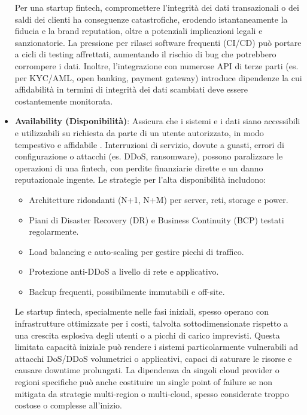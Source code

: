 \begin{itemize}
Per una startup fintech, compromettere l'integrità dei dati transazionali o dei saldi dei clienti ha conseguenze catastrofiche, erodendo istantaneamente la fiducia e la brand reputation, oltre a potenziali implicazioni legali e sanzionatorie. La pressione per rilasci software frequenti (CI/CD) può portare a cicli di testing affrettati, aumentando il rischio di bug che potrebbero corrompere i dati. Inoltre, l'integrazione con numerose API di terze parti (es. per KYC/AML, open banking, payment gateway) introduce dipendenze la cui affidabilità in termini di integrità dei dati scambiati deve essere costantemente monitorata.

\item \textbf{Availability (Disponibilità)}: Assicura che i sistemi e i dati siano accessibili e utilizzabili su richiesta da parte di un utente autorizzato, in modo tempestivo e affidabile \cite{NIST_SP_1800_26}. Interruzioni di servizio, dovute a guasti, errori di configurazione o attacchi (es. DDoS, ransomware), possono paralizzare le operazioni di una fintech, con perdite finanziarie dirette e un danno reputazionale ingente. Le strategie per l'alta disponibilità includono:
\begin{itemize}
    \item Architetture ridondanti (N+1, N+M) per server, reti, storage e power.
    \item Piani di Disaster Recovery (DR) e Business Continuity (BCP) testati regolarmente.
    \item Load balancing e auto-scaling per gestire picchi di traffico.
    \item Protezione anti-DDoS a livello di rete e applicativo.
    \item Backup frequenti, possibilmente immutabili e off-site.
\end{itemize}

Le startup fintech, specialmente nelle fasi iniziali, spesso operano con infrastrutture ottimizzate per i costi, talvolta sottodimensionate rispetto a una crescita esplosiva degli utenti o a picchi di carico imprevisti. Questa limitata capacità iniziale può rendere i sistemi particolarmente vulnerabili ad attacchi DoS/DDoS volumetrici o applicativi, capaci di saturare le risorse e causare downtime prolungati. La dipendenza da singoli cloud provider o regioni specifiche può anche costituire un single point of failure se non mitigata da strategie multi-region o multi-cloud, spesso considerate troppo costose o complesse all'inizio.
\end{itemize}
